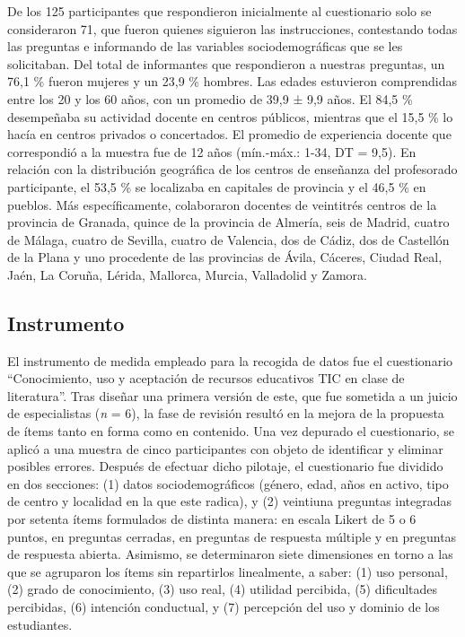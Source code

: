 \documentclass[spanish]{textolivre}
\begin{document}
De los 125 participantes que respondieron inicialmente al cuestionario solo se consideraron 71, que fueron quienes siguieron las instrucciones, contestando todas las preguntas e informando de las variables sociodemográficas que se les solicitaban. Del total de informantes que respondieron a nuestras preguntas, un 76,1 \% fueron mujeres y un 23,9 \% hombres. Las edades estuvieron comprendidas entre los 20 y los 60 años, con un promedio de 39,9 ± 9,9 años. El 84,5 \% desempeñaba su actividad docente en centros públicos, mientras que el 15,5 \% lo hacía en centros privados o concertados. El promedio de experiencia docente que correspondió a la muestra fue de 12 años (mín.-máx.: 1-34, DT = 9,5).  
En relación con la distribución geográfica de los centros de enseñanza del profesorado participante, el 53,5 \% se localizaba en capitales de provincia y el 46,5 \% en pueblos. Más específicamente, colaboraron docentes de veintitrés centros de la provincia de Granada, quince de la provincia de Almería, seis de Madrid, cuatro de Málaga, cuatro de Sevilla, cuatro de Valencia, dos de Cádiz, dos de Castellón de la Plana y uno procedente de las provincias de Ávila, Cáceres, Ciudad Real, Jaén, La Coruña, Lérida, Mallorca, Murcia, Valladolid y Zamora.

\subsection{Instrumento}\label{sec-conduta}
El instrumento de medida empleado para la recogida de datos fue el cuestionario “Conocimiento, uso y aceptación de recursos educativos TIC en clase de literatura”. Tras diseñar una primera versión de este, que fue sometida a un juicio de especialistas (\textit{n} = 6), la fase de revisión resultó en la mejora de la propuesta de ítems tanto en forma como en contenido. Una vez depurado el cuestionario, se aplicó a una muestra de cinco participantes con objeto de identificar y eliminar posibles errores. Después de efectuar dicho pilotaje, el cuestionario fue dividido en dos secciones: (1) datos sociodemográficos (género, edad, años en activo, tipo de centro y localidad en la que este radica), y (2) veintiuna preguntas integradas por setenta ítems formulados de distinta manera: en escala Likert de 5 o 6 puntos, en preguntas cerradas, en preguntas de respuesta múltiple y en preguntas de respuesta abierta. Asimismo, se determinaron siete dimensiones en torno a las que se agruparon los ítems sin repartirlos linealmente, a saber: (1) uso personal, (2) grado de conocimiento, (3) uso real, (4) utilidad percibida, (5) dificultades percibidas, (6) intención conductual, y (7) percepción del uso y dominio de los estudiantes. 
\end{document}
